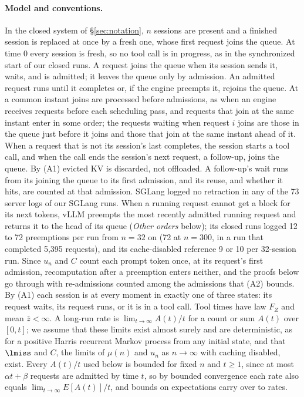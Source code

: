 \paragraph{Model and conventions.} In the closed system of \S\ref{sec:notation}, $n$ sessions are present and a finished session is replaced at once by a fresh one, whose first request joins the queue. At time 0 every session is fresh, so no tool call is in progress, as in the synchronized start of our closed runs. A request joins the queue when its session sends it, waits, and is admitted; it leaves the queue only by admission. An admitted request runs until it completes or, if the engine preempts it, rejoins the queue. At a common instant joins are processed before admissions, as when an engine receives requests before each scheduling pass, and requests that join at the same instant enter in some order; the requests waiting when request $i$ joins are those in the queue just before it joins and those that join at the same instant ahead of it. When a request that is not its session's last completes, the session starts a tool call, and when the call ends the session's next request, a follow-up, joins the queue. By (A1) evicted KV is discarded, not offloaded. A follow-up's wait runs from its joining the queue to its first admission, and its reuse, and whether it hits, are counted at that admission. SGLang logged no retraction in any of the 73 server logs of our SGLang runs. When a running request cannot get a block for its next tokens, vLLM preempts the most recently admitted running request and returns it to the head of its queue (\emph{Other orders} below); its closed runs logged 12 to 72 preemptions per run from $n=32$ on (72 at $n=300$, in a run that completed 5,395 requests), and its cache-disabled reference 9 or 10 per 32-session run. Since $u_n$ and $C$ count each prompt token once, at its request's first admission, recomputation after a preemption enters neither, and the proofs below go through with re-admissions counted among the admissions that (A2) bounds. By (A1) each session is at every moment in exactly one of three states: its request waits, its request runs, or it is in a tool call. Tool times have law $F_Z$ and mean $\bar z<\infty$. A long-run rate is $\lim_{t\to\infty}A(t)/t$ for a count or sum $A(t)$ over $[0,t]$; we assume that these limits exist almost surely and are deterministic, as for a positive Harris recurrent Markov process from any initial state, and that $\lmiss$ and $C$, the limits of $\mu(n)$ and $u_n$ as $n\to\infty$ with caching disabled, exist. Every $A(t)/t$ used below is bounded for fixed $n$ and $t\ge1$, since at most $\alpha t+\beta$ requests are admitted by time $t$, so by bounded convergence each rate also equals $\lim_{t\to\infty}E[A(t)]/t$, and bounds on expectations carry over to rates.

